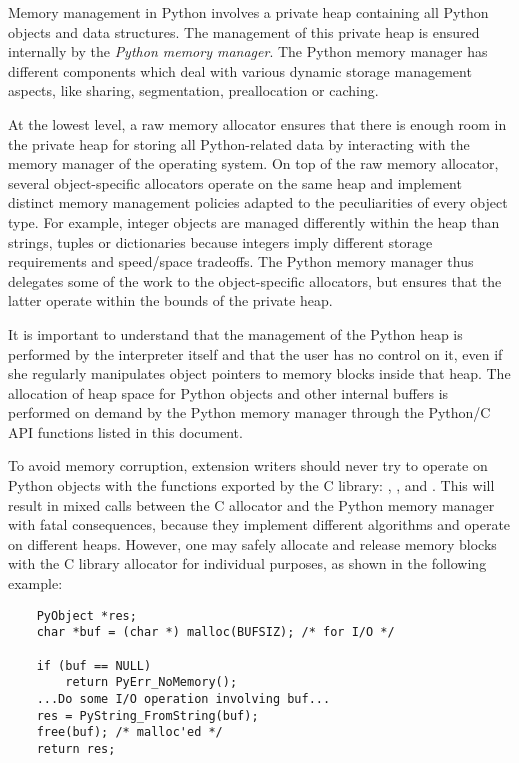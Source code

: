 \documentclass{manual}
\begin{document}
Memory management in Python involves a private heap containing all
Python objects and data structures. The management of this private
heap is ensured internally by the \emph{Python memory manager}.  The
Python memory manager has different components which deal with various
dynamic storage management aspects, like sharing, segmentation,
preallocation or caching.

At the lowest level, a raw memory allocator ensures that there is
enough room in the private heap for storing all Python-related data
by interacting with the memory manager of the operating system. On top
of the raw memory allocator, several object-specific allocators
operate on the same heap and implement distinct memory management
policies adapted to the peculiarities of every object type. For
example, integer objects are managed differently within the heap than
strings, tuples or dictionaries because integers imply different
storage requirements and speed/space tradeoffs. The Python memory
manager thus delegates some of the work to the object-specific
allocators, but ensures that the latter operate within the bounds of
the private heap.

It is important to understand that the management of the Python heap
is performed by the interpreter itself and that the user has no
control on it, even if she regularly manipulates object pointers to
memory blocks inside that heap.  The allocation of heap space for
Python objects and other internal buffers is performed on demand by
the Python memory manager through the Python/C API functions listed in
this document.

To avoid memory corruption, extension writers should never try to
operate on Python objects with the functions exported by the C
library: ,
,
 and
.  This will result in 
mixed calls between the C allocator and the Python memory manager
with fatal consequences, because they implement different algorithms
and operate on different heaps.  However, one may safely allocate and
release memory blocks with the C library allocator for individual
purposes, as shown in the following example:

\begin{verbatim}
    PyObject *res;
    char *buf = (char *) malloc(BUFSIZ); /* for I/O */

    if (buf == NULL)
        return PyErr_NoMemory();
    ...Do some I/O operation involving buf...
    res = PyString_FromString(buf);
    free(buf); /* malloc'ed */
    return res;
\end{verbatim}
\end{document}
